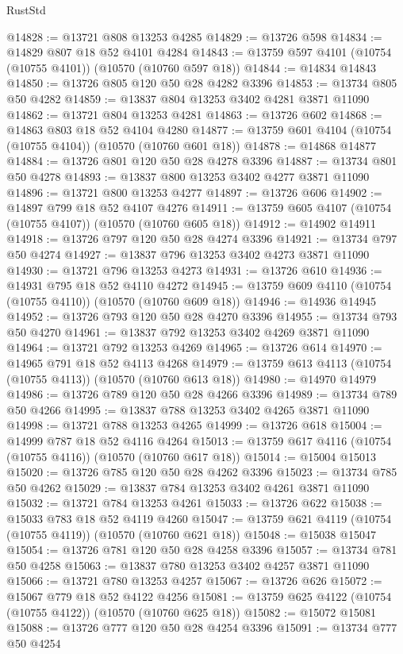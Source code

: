 \begin{lexlean}{RustStd}
\begin{coremodule}
@14828 := @13721 @808 @13253 @4285
@14829 := @13726 @598
@14834 := @14829 @807 @18 @52 @4101 @4284
@14843 := @13759 @597 @4101 (@10754 (@10755 @4101)) (@10570 (@10760 @597 @18))
@14844 := @14834 @14843
@14850 := @13726 @805 @120 @50 @28 @4282 @3396
@14853 := @13734 @805 @50 @4282
@14859 := @13837 @804 @13253 @3402 @4281 @3871 @11090
@14862 := @13721 @804 @13253 @4281
@14863 := @13726 @602
@14868 := @14863 @803 @18 @52 @4104 @4280
@14877 := @13759 @601 @4104 (@10754 (@10755 @4104)) (@10570 (@10760 @601 @18))
@14878 := @14868 @14877
@14884 := @13726 @801 @120 @50 @28 @4278 @3396
@14887 := @13734 @801 @50 @4278
@14893 := @13837 @800 @13253 @3402 @4277 @3871 @11090
@14896 := @13721 @800 @13253 @4277
@14897 := @13726 @606
@14902 := @14897 @799 @18 @52 @4107 @4276
@14911 := @13759 @605 @4107 (@10754 (@10755 @4107)) (@10570 (@10760 @605 @18))
@14912 := @14902 @14911
@14918 := @13726 @797 @120 @50 @28 @4274 @3396
@14921 := @13734 @797 @50 @4274
@14927 := @13837 @796 @13253 @3402 @4273 @3871 @11090
@14930 := @13721 @796 @13253 @4273
@14931 := @13726 @610
@14936 := @14931 @795 @18 @52 @4110 @4272
@14945 := @13759 @609 @4110 (@10754 (@10755 @4110)) (@10570 (@10760 @609 @18))
@14946 := @14936 @14945
@14952 := @13726 @793 @120 @50 @28 @4270 @3396
@14955 := @13734 @793 @50 @4270
@14961 := @13837 @792 @13253 @3402 @4269 @3871 @11090
@14964 := @13721 @792 @13253 @4269
@14965 := @13726 @614
@14970 := @14965 @791 @18 @52 @4113 @4268
@14979 := @13759 @613 @4113 (@10754 (@10755 @4113)) (@10570 (@10760 @613 @18))
@14980 := @14970 @14979
@14986 := @13726 @789 @120 @50 @28 @4266 @3396
@14989 := @13734 @789 @50 @4266
@14995 := @13837 @788 @13253 @3402 @4265 @3871 @11090
@14998 := @13721 @788 @13253 @4265
@14999 := @13726 @618
@15004 := @14999 @787 @18 @52 @4116 @4264
@15013 := @13759 @617 @4116 (@10754 (@10755 @4116)) (@10570 (@10760 @617 @18))
@15014 := @15004 @15013
@15020 := @13726 @785 @120 @50 @28 @4262 @3396
@15023 := @13734 @785 @50 @4262
@15029 := @13837 @784 @13253 @3402 @4261 @3871 @11090
@15032 := @13721 @784 @13253 @4261
@15033 := @13726 @622
@15038 := @15033 @783 @18 @52 @4119 @4260
@15047 := @13759 @621 @4119 (@10754 (@10755 @4119)) (@10570 (@10760 @621 @18))
@15048 := @15038 @15047
@15054 := @13726 @781 @120 @50 @28 @4258 @3396
@15057 := @13734 @781 @50 @4258
@15063 := @13837 @780 @13253 @3402 @4257 @3871 @11090
@15066 := @13721 @780 @13253 @4257
@15067 := @13726 @626
@15072 := @15067 @779 @18 @52 @4122 @4256
@15081 := @13759 @625 @4122 (@10754 (@10755 @4122)) (@10570 (@10760 @625 @18))
@15082 := @15072 @15081
@15088 := @13726 @777 @120 @50 @28 @4254 @3396
@15091 := @13734 @777 @50 @4254

\end{coremodule}
\end{lexlean}
